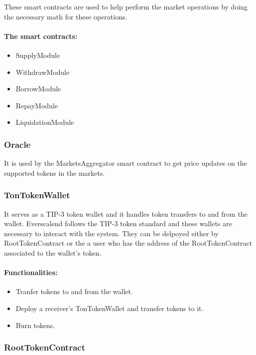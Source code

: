 These smart contracts are used to help perform the market operations by doing the necessary math for these operations. 

\paragraph*{The smart contracts:}
\begin{itemize}
  \item SupplyModule
  \item WithdrawModule
  \item BorrowModule
  \item RepayModule
  \item LiquidationModule
\end{itemize}

\subsubsection{Oracle}

It is used by the MarketsAggregator smart contract to get price updates on the supported tokens in the markets.

\subsubsection{TonTokenWallet}

It serves as a TIP-3 token wallet and it handles token transfers to and from the wallet. Everscalend follows the TIP-3 token standard and these wallets are necessary to interact with the system. They can be delpoyed either by RootTokenContract or the a user who has the address of the RootTokenContract associated to the wallet's token.

\paragraph*{Functionalities:}
\begin{itemize}
  \item Tranfer tokens to and from the wallet.
  \item Deploy a receiver's TonTokenWallet and transfer tokens to it.
  \item Burn tokens.
\end{itemize}

\subsubsection{RootTokenContract}


